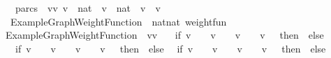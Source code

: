 \begin{isabellebody}
\ \ parcs\ {\isacharequal}\ {\isacharbraceleft}{\isacharparenleft}vv\ v\ {\isasymin}\ {\isacharbraceleft}{}{\isacharcomma}{}{\isacharcomma}{}{\isacharcomma}{\isacharparenleft}{}{\isacharcolon}{\isacharcolon}nat{\isacharparenright}{\isacharbraceright}\ {\isasymand}\ v\ {\isasymin}\ {\isacharbraceleft}{}{\isacharcomma}{}{\isacharcomma}{}{\isacharcomma}{\isacharparenleft}{}{\isacharcolon}{\isacharcolon}nat{\isacharparenright}{\isacharbraceright}\ {\isasymand}\ v\ {\isasymnoteq}\ v\ \isanewline
{\isacharbar}{\isacharparenright}{\isachardoublequoteclose}\ \isanewline
\isanewline
{}\isamarkupfalse%
\ ExampleGraphWeightFunction\ {\isacharcolon}{\isacharcolon}\ {\isachardoublequoteopen}{\isacharparenleft}nat{\isasymtimes}nat{\isacharparenright}\ weight{\isacharunderscore}fun{\isachardoublequoteclose}\ \ \isanewline
{\isachardoublequoteopen}ExampleGraphWeightFunction\ {\isasymequiv}\ {\isacharparenleft}{\isasymlambda}{\isacharparenleft}vv\ \isanewline
\ \ {\isacharparenleft}if\ {\isacharparenleft}v\ {\isacharequal}\ {}\ {\isasymand}\ v\ {\isacharequal}\ {}{\isacharparenright}\ {\isasymor}\ {\isacharparenleft}v\ {\isacharequal}\ {}\ {\isasymand}\ v\ {\isacharequal}\ {}{\isacharparenright}\ then\ {}\ else\isanewline
\ \ {\isacharparenleft}if\ {\isacharparenleft}v\ {\isacharequal}\ {}\ {\isasymand}\ v\ {\isacharequal}\ {}{\isacharparenright}\ {\isasymor}\ {\isacharparenleft}v\ {\isacharequal}\ {}\ {\isasymand}\ v\ {\isacharequal}\ {}{\isacharparenright}\ then\ {}\ else\isanewline
\ \ {\isacharparenleft}if\ {\isacharparenleft}v\ {\isacharequal}\ {}\ {\isasymand}\ v\ {\isacharequal}\ {}{\isacharparenright}\ {\isasymor}\ {\isacharparenleft}v\ {\isacharequal}\ {}\ {\isasymand}\ v\ {\isacharequal}\ {}{\isacharparenright}\ then\ {}\ else\isanewline

\end{isabellebody}
